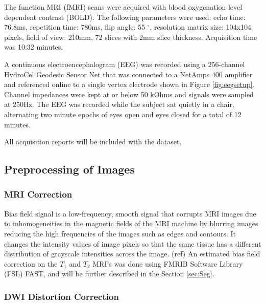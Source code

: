 The function MRI (fMRI) scans were acquired with blood oxygenation level dependent contrast (BOLD). The following parameters were used:  echo time: 76.8ms, repetition time: 780ms, flip angle: 55 $^{\circ}$, resolution matrix size: 104x104 pixels, field of view: 210mm, 72 slices with 2mm slice thickness. Acquisition time was 10:32 minutes.

A continuous electroencephalogram (EEG) was recorded using a 256-channel HydroCel Geodesic Sensor Net that was connected to a NetAmps 400 amplifier and referenced online to a single vertex electrode shown in Figure \ref{fig:eegsetup}. Channel impedances were kept at or below 50 kOhms and signals were sampled at 250Hz. The EEG was recorded while the subject sat quietly in a chair, alternating two minute epochs of eyes open and eyes closed for a total of 12 minutes. 

All acquisition reports will be included with the dataset. 


\subsection{Preprocessing of Images}
\label{sec:preprocess}

\subsubsection{MRI Correction}

Bias field signal is a low-frequency, smooth signal that corrupts MRI images due to inhomogeneities in the magnetic fields of the MRI machine by blurring images reducing the high frequencies of the images such as edges and contours. It changes the intensity values of image pixels so that the same tissue has a different distribution of grayscale intensities across the image. (ref) An estimated bias field correction on the $T_1$ and $T_2$ MRI's was done using FMRIB Software Library (FSL) FAST, and will be further described in the Section \ref{sec:Seg}.

\subsubsection{DWI Distortion Correction}

